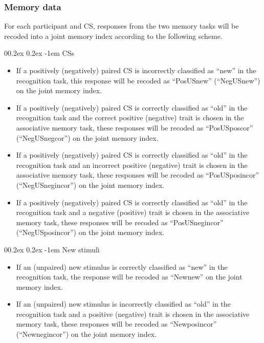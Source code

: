 \documentclass[
  doc,floatsintext]{apa6}
\makeatletter
\let\oldparagraph\paragraph
\renewcommand{\paragraph}[1]{\oldparagraph{#1}\mbox{}}
\renewcommand{\paragraph}{\@startsection{paragraph}{4}{\parindent}%
  {0\baselineskip \@plus 0.2ex \@minus 0.2ex}%
  {-1em}%
  {\normalfont\normalsize\bfseries\itshape\typesectitle}}
\makeatother
\begin{document}
\hypertarget{memory-data}{%
\subsubsection{Memory data}\label{memory-data}}

For each participant and CS, responses from the two memory tasks will be recoded into a joint memory index according to the following scheme.

\hypertarget{css}{%
\paragraph{CSs}\label{css}}

\begin{itemize}
\item
  If a positively (negatively) paired CS is incorrectly classified as ``new'' in the recognition task, this response will be recoded as ``PosUSnew'' (``NegUSnew'') on the joint memory index.
\item
  If a positively (negatively) paired CS is correctly classified as ``old'' in the recognition task and the correct positive (negative) trait is chosen in the associative memory task, these responses will be recoded as ``PosUSposcor'' (``NegUSnegcor'') on the joint memory index.
\item
  If a positively (negatively) paired CS is correctly classified as ``old'' in the recognition task and an incorrect positive (negative) trait is chosen in the associative memory task, these responses will be recoded as ``PosUSposincor'' (``NegUSnegincor'') on the joint memory index.
\item
  If a positively (negatively) paired CS is correctly classified as ``old'' in the recognition task and a negative (positive) trait is chosen in the associative memory task, these responses will be recoded as ``PosUSnegincor'' (``NegUSposincor'') on the joint memory index.
\end{itemize}

\hypertarget{new-stimuli}{%
\paragraph{New stimuli}\label{new-stimuli}}

\begin{itemize}
\item
  If an (unpaired) new stimulus is correctly classified as ``new'' in the recognition task, the response will be recoded as ``Newnew'' on the joint memory index.
\item
  If an (unpaired) new stimulus is incorrectly classified as ``old'' in the recognition task and a positive (negative) trait is chosen in the associative memory task, these responses will be recoded as ``Newposincor'' (``Newnegincor'') on the joint memory index.
\end{itemize}
\end{document}
